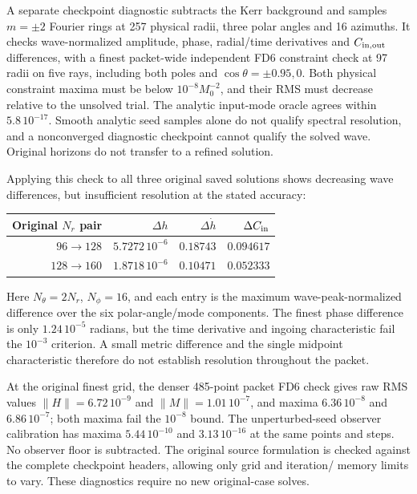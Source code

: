 \documentclass[aps,prd,preprint,notitlepage,nofootinbib]{revtex4-2}
\begin{document}
A separate checkpoint diagnostic subtracts the Kerr background and samples
$m=\pm2$ Fourier rings at 257 physical radii, three polar angles and 16 azimuths.
It checks wave-normalized amplitude, phase, radial/time derivatives and
$C_{\rm in,out}$ differences, with a finest packet-wide independent FD6
constraint check at 97 radii on five rays, including both poles and
$\cos\theta=\pm0.95,0$. Both physical constraint maxima must be below
$10^{-8}M_0^{-2}$, and their RMS must decrease relative to the unsolved trial. The analytic input-mode oracle agrees within
$5.8\,10^{-17}$. Smooth analytic seed samples alone do not qualify spectral
resolution, and a nonconverged diagnostic checkpoint cannot qualify the
solved wave. Original horizons do not transfer to a refined solution.

Applying this check to all three original saved solutions shows decreasing
wave differences, but insufficient resolution at the stated accuracy:
\begin{center}
\begin{tabular}{rrrr}
\toprule
Original $N_r$ pair & $\Delta h$ & $\Delta\dot h$ & $\Delta C_{\rm in}$\\
\midrule
$96\to128$ & $5.7272\,10^{-6}$ & $0.18743$ & $0.094617$\\
$128\to160$ & $1.8718\,10^{-6}$ & $0.10471$ & $0.052333$\\
\bottomrule
\end{tabular}
\end{center}
Here $N_\theta=2N_r$, $N_\phi=16$, and each entry is the maximum
wave-peak-normalized difference over the six polar-angle/mode components.
The finest phase difference is only $1.24\,10^{-5}$ radians, but the time
derivative and ingoing characteristic fail the $10^{-3}$ criterion.
A small metric difference and the single midpoint characteristic therefore
do not establish resolution throughout the packet.

At the original finest grid, the denser 485-point packet FD6 check gives
raw RMS values $\|H\|=6.72\,10^{-9}$ and $\|M\|=1.01\,10^{-7}$,
and maxima $6.36\,10^{-8}$ and $6.86\,10^{-7}$; both maxima fail the
$10^{-8}$ bound. The unperturbed-seed observer calibration has maxima
$5.44\,10^{-10}$ and $3.13\,10^{-16}$ at the same points and steps.
No observer floor is subtracted. The original source formulation is checked
against the complete checkpoint headers, allowing only grid and iteration/
memory limits to vary. These diagnostics require no new original-case solves.
\end{document}
